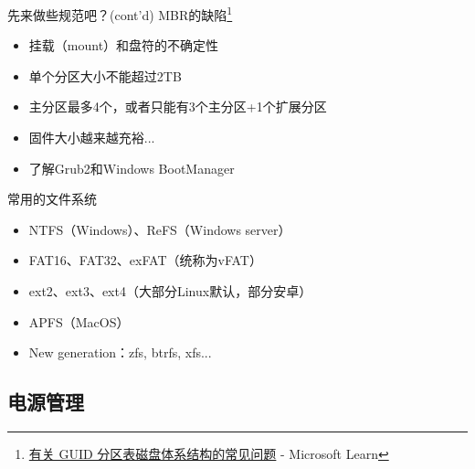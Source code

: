 \documentclass[aspectratio=1610]{beamer}
\begin{document}
\begin{frame}{先来做些规范吧？(cont'd)}
    MBR的缺陷\footnote{\href{https://learn.microsoft.com/zh-cn/troubleshoot/windows-server/backup-and-storage/guid-partitioning-table-disk-faq}{有关 GUID 分区表磁盘体系结构的常见问题} - Microsoft Learn}
    \begin{center}
        \begin{itemize}
            \item 挂载（mount）和盘符的不确定性
            \item 单个分区大小不能超过2TB
            \item 主分区最多4个，或者只能有3个主分区+1个扩展分区
            \item 固件大小越来越充裕...
            \item 了解Grub2和Windows BootManager
        \end{itemize}
    \end{center}

    常用的文件系统
    \begin{center}
        \begin{itemize}
            \item NTFS（Windows）、ReFS（Windows server）
            \item FAT16、FAT32、exFAT（统称为vFAT）
            \item ext2、ext3、ext4（大部分Linux默认，部分安卓）
            \item APFS（MacOS）
            \item New generation：zfs, btrfs, xfs...
        \end{itemize}
    \end{center}
\end{frame}

\subsection{电源管理}
\end{document}
